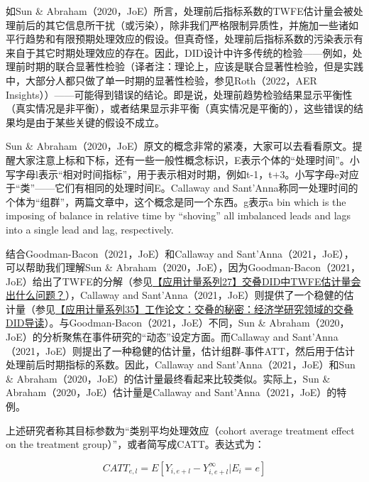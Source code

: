 \documentclass[cn,12pt,math=newtx,citestyle=gb7714-2015,bibstyle=gb7714-2015]{elegantbook}
\begin{document}
	如Sun \& Abraham（2020，JoE）所言，处理前后指标系数的TWFE估计量会被处理前后的其它信息所干扰（或污染），除非我们严格限制异质性，并施加一些诸如平行趋势和有限预期处理效应的假设。但真奇怪，处理前后指标系数的污染表示有来自于其它时期处理效应的存在。因此，DID设计中许多传统的检验——例如，处理前时期的联合显著性检验（译者注：理论上，应该是联合显著性检验，但是实践中，大部分人都只做了单一时期的显著性检验，参见Roth（2022，AER Insights））——可能得到错误的结论。即是说，处理前趋势检验结果显示平衡性（真实情况是非平衡），或者结果显示非平衡（真实情况是平衡的），这些错误的结果均是由于某些关键的假设不成立。
	
	Sun \& Abraham（2020，JoE）原文的概念非常的紧凑，大家可以去看看原文。提醒大家注意上标和下标，还有一些一般性概念标识，E表示个体的“处理时间”。小写字母l表示“相对时间指标”，用于表示相对时期，例如t-1，t+3。小写字母e对应于“类”——它们有相同的处理时间E。Callaway and Sant'Anna称同一处理时间的个体为“组群”，两篇文章中，这个概念是同一个东西。g表示a bin which is the imposing of balance in relative time by “shoving” all imbalanced leads and lags into a single lead and lag, respectively.
	
	结合Goodman-Bacon（2021，JoE）和Callaway and Sant'Anna（2021，JoE），可以帮助我们理解Sun \& Abraham（2020，JoE），因为Goodman-Bacon（2021，JoE）给出了TWFE的分解（参见\href{https://mp.weixin.qq.com/s?__biz=MzAwODY5MDA3NA==&mid=2455734166&idx=1&sn=b7aeb41c8fc596a1a11a8b37af84bda7&chksm=8cc02763bbb7ae75acd49c39c11df0bc06858770940403ec78f136625063bcafa5780b63a5dd&scene=21#wechat_redirect}{【应用计量系列27】交叠DID中TWFE估计量会出什么问题？}），Callaway and Sant'Anna（2021，JoE）则提供了一个稳健的估计量（参见\href{https://mp.weixin.qq.com/s?__biz=MzAwODY5MDA3NA==&mid=2455734924&idx=1&sn=5990e3522a6a5288134d9205c1fe163b&chksm=8cc02a79bbb7a36f2f86680b85f4fb336c7469e7b187e2c1f8bb9165729a7097164488e729a5&scene=21#wechat_redirect}{【应用计量系列35】工作论文：交叠的秘密：经济学研究领域的交叠DID导读}）。与Goodman-Bacon（2021，JoE）不同，Sun \& Abraham（2020，JoE）的分析聚焦在事件研究的“动态”设定方面。而Callaway and Sant'Anna（2021，JoE）则提出了一种稳健的估计量，估计组群-事件ATT，然后用于估计处理前后时期指标的系数。因此，Callaway and Sant'Anna（2021，JoE）和Sun \& Abraham（2020，JoE）的估计量最终看起来比较类似。实际上，Sun \& Abraham（2020，JoE）估计量是Callaway and Sant'Anna（2021，JoE）的特例。
	
	上述研究者称其目标参数为“类别平均处理效应（cohort average treatment effect on the treatment group）”，或者简写成CATT。表达式为：
	
	\begin{equation}
		CATT_{e,l}=E[Y_{i,e+l}-Y_{i,e+l}^\infty | E_i=e]
	\end{equation}
	
\end{document}
